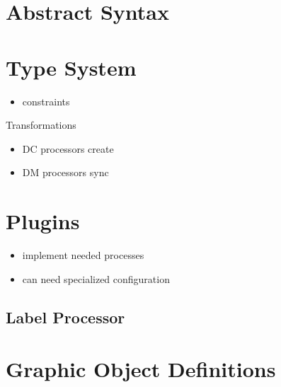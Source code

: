 \section{Abstract Syntax}

\section{Type System}
\begin{itemize}
  \item constraints
\end{itemize}

Transformations

\begin{itemize}
  \item DC processors create
  \item DM processors sync
\end{itemize}

\section{Plugins}
\begin{itemize}
  \item implement needed processes
  \item can need specialized configuration
\end{itemize}
\subsection{Label Processor}


\section{Graphic Object Definitions}